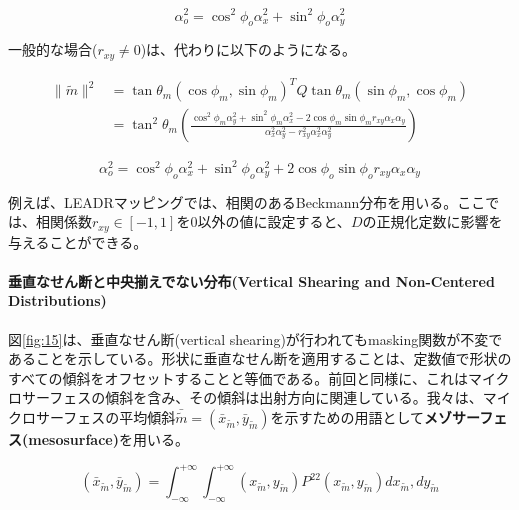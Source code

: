 \documentclass[a4j,xelatex,ja=standard]{bxjsarticle}
\begin{document}
\begin{equation}
    \alpha^2_o = \cos^2 \phi_o \alpha^2_x + \sin^2 \phi_o \alpha^2_y
    \label{eq:91}
\end{equation}

一般的な場合($r_{xy} \neq 0$)は、代わりに以下のようになる。

\begin{equation}
    \begin{split}
        \|\tilde{m}\|^2 & = \tan\theta_m(\cos\phi_m, \sin\phi_m)^T Q \tan\theta_m(\sin\phi_m, \cos\phi_m) \\
                        & = \tan^2 \theta_m \left( \frac{\cos^2 \phi_m \alpha^2_y + \sin^2 \phi_m \alpha^2_x - 2\cos\phi_m \sin\phi_m r_{xy} \alpha_x \alpha_y}{\alpha^2_x \alpha^2_y - r^2_{xy} \alpha^2_x \alpha^2_y} \right)
    \end{split}
    \label{eq:92}
\end{equation}

\begin{equation}
    \alpha^2_o = \cos^2 \phi_o \alpha^2_x + \sin^2 \phi_o \alpha^2_y + 2 \cos\phi_o \sin\phi_o r_{xy} \alpha_x \alpha_y
    \label{eq:93}
\end{equation}

例えば、LEADRマッピングでは、相関のあるBeckmann分布を用いる\cite{Dupuy2013}。ここでは、相関係数$r_{xy} \in [-1, 1]$を0以外の値に設定すると、$D$の正規化定数に影響を与えることができる。

\paragraph{垂直なせん断と中央揃えでない分布(Vertical Shearing and Non-Centered Distributions)}

図\ref{fig:15}は、垂直なせん断(vertical shearing)が行われてもmasking関数が不変であることを示している。形状に垂直なせん断を適用することは、定数値で形状のすべての傾斜をオフセットすることと等価である。前回と同様に、これはマイクロサーフェスの傾斜を含み、その傾斜は出射方向に関連している。我々は、マイクロサーフェスの平均傾斜$\bar{\tilde{m}} = (\bar{x}_{\tilde{m}}, \bar{y}_{\tilde{m}})$を示すための用語として\textbf{メゾサーフェス(mesosurface)}を用いる。

\begin{equation}
    (\bar{x}_{\tilde{m}}, \bar{y}_{\tilde{m}}) = \int_{-\infty}^{+\infty} \int_{-\infty}^{+\infty} (x_{\tilde{m}}, y_{\tilde{m}}) P^{22}(x_{\tilde{m}}, y_{\tilde{m}}) dx_{\tilde{m}}, dy_{\tilde{m}}
    \label{eq:94}
\end{equation}
\end{document}
